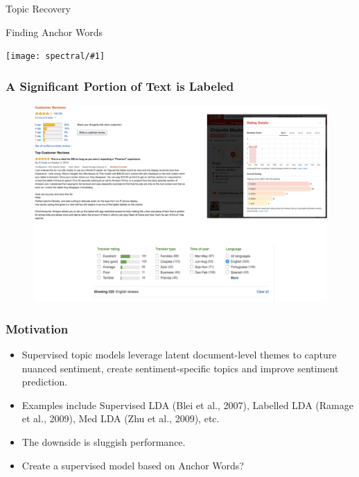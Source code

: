 \documentclass[compress]{beamer}
\newcommand{\gfx}[2]{
\begin{center}
	\texttt{[image: spectral/\#1]}
\end{center}
}
\begin{document}
\begin{frame}{Topic Recovery}

\end{frame}

\begin{frame}{Finding Anchor Words}

  \gfx{convex_hull}{.8}

\end{frame}


\begin{frame}
\frametitle{A Significant Portion of Text is Labeled}

\begin{figure}
\centering
\includegraphics[width=1\linewidth]{spectral/amazon_example.pdf}
\end{figure}

\end{frame}

\begin{frame}
\frametitle{Motivation}
\begin{itemize}
\item Supervised topic models leverage latent document-level themes to capture nuanced sentiment, create sentiment-specific topics and improve sentiment prediction.
\item Examples include Supervised LDA (Blei et al., 2007),  Labelled LDA (Ramage et al., 2009), Med LDA (Zhu et al., 2009), etc.
\item The downside is sluggish performance.
\item <2-> \alert{Create a supervised model based on Anchor Words?}
\end{itemize}
\end{frame}
\end{document}
